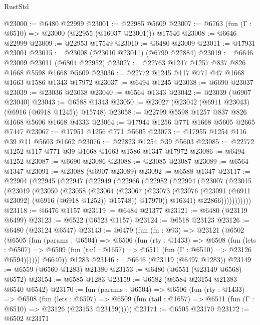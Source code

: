 \begin{lexlean}{RustStd}
\begin{coremodule}
@23000 := @6480 @22999
@23001 := @22985 @5609
@23007 := @6763 (fun (Γ : @6510) => @23000 (@22955 (@16037 @23001))) @17546
@23008 := @6646 @22999
@23009 := @22953 @17549
@23010 := @6480 @23009
@23011 := @17931 @23001
@23015 := @23008 (@23010 @23011) (@6799 @22884)
@23019 := @6646 @23009 @23011 (@6804 @22952)
@23027 := @22763 @1247 @1257 @837 @826 @1668 @5598 @1668 @5609
@23036 := @22772 @1245 @117 @771 @47 @1668 @1663 @1586 @1343 @17972
@23037 := @6494 @1245
@23038 := @6690 @23037
@23039 := @23036 @23038
@23040 := @6564 @1343
@23042 := @23039 (@6907 @23040)
@23043 := @6588 @1343
@23050 := @23027 (@23042 (@6911 @23043) (@6916 (@6918 @1245)) @15748)
@23058 := @22799 @5598 @1257 @837 @826 @1668 @5606 @1668 @4333
@23064 := @17944 @1256 @771 @1668 @5605 @2665 @7447
@23067 := @17951 @1256 @771 @5605
@23073 := @17955 @1254 @116 @39 @11 @5603 @1662
@23076 := @22823 @1254 @39 @5603
@23085 := @22772 @1252 @117 @771 @39 @1668 @1663 @1586 @1347 @17972
@23086 := @6494 @1252
@23087 := @6690 @23086
@23088 := @23085 @23087
@23089 := @6564 @1347
@23091 := @23088 (@6907 @23089)
@23092 := @6588 @1347
@23117 := @22904
    (@22945
      (@22947
        (@22949
          (@22966
            (@22982
              (@22994
                (@23007
                  (@23015
                    (@23019
                      (@23050
                        (@23058
                          (@23064
                            (@23067
                              (@23073
                                (@23076 (@23091 (@6911 @23092) (@6916 (@6918 @1252)) @15748))
                                @17970))
                            @16341)
                          @22866)))))))))))
@23118 := @6476 @1157
@23119 := @6484 @21377
@23121 := @6480 (@23119 @6499)
@23123 := @6522 (@6523 @1157)
@23124 := @6518 @23123
@23126 := @6480 (@23124 @6547)
@23143 := @6479
    (fun (fn : @93) =>
    @23121
      (@6502
        (@6505
          (fun (params : @6504) =>
          @6506
            (fun (rty : @1433) =>
            @6508
              (fun (lets : @6507) =>
              @6509 (fun (tail : @1657) => @6511 (fun (Γ : @6510) => @23126 @6594))))))
        @6640))
    @1283
@23146 := @6646 (@23119 (@6497 @1283))
@23149 := @6559 (@6560 @1283) @21380
@23153 := @6480 (@6551 (@23149 @6568) @6572)
@23154 := @6585 @1283
@23159 := @6582 (@6584 @23154 @21383 @6540 @6542)
@23170 := fun (params : @6504) =>
  @6506
    (fun (rty : @1433) =>
    @6508
      (fun (lets : @6507) =>
      @6509 (fun (tail : @1657) => @6511 (fun (Γ : @6510) => @23126 (@23153 @23159)))))
@23171 := @6505 @23170
@23172 := @6502 @23171

\end{coremodule}
\end{lexlean}
